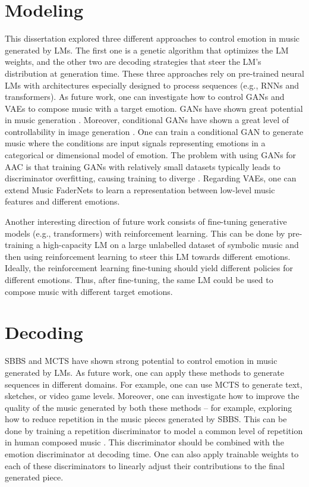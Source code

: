 \section{Modeling}

This dissertation explored three different approaches to control emotion in music generated by LMs. The first one is a genetic algorithm that optimizes the LM weights, and the other two are decoding strategies that steer the LM's distribution at generation time. These three approaches rely on pre-trained neural LMs with architectures especially designed to process sequences (e.g., RNNs and transformers). As future work, one can investigate how to control GANs and VAEs to compose music with a target emotion. GANs have shown great potential in music generation \cite{muhamed2021symbolic}. Moreover, conditional GANs have shown a great level of controllability in image generation \cite{mirza2014conditional}. One can train a conditional GAN to generate music where the conditions are input signals representing emotions in a categorical or dimensional model of emotion. The problem with using GANs for AAC is that training GANs with relatively small datasets typically leads to discriminator overfitting, causing training to diverge \cite{karras2020training}. Regarding VAEs, one can extend Music FaderNets \cite{tan2020music} to learn a representation between low-level music features and different emotions.

Another interesting direction of future work consists of fine-tuning generative models (e.g., transformers) with reinforcement learning. This can be done by pre-training a high-capacity LM on a large unlabelled dataset of symbolic music and then using reinforcement learning to steer this LM towards different emotions. Ideally, the reinforcement learning fine-tuning should yield different policies for different emotions. Thus, after fine-tuning, the same LM could be used to compose music with different target emotions.

\section{Decoding}

SBBS and MCTS have shown strong potential to control emotion in music generated by LMs. As future work, one can apply these methods to generate sequences in different domains. For example, one can use MCTS to generate text, sketches, or video game levels. Moreover, one can investigate how to improve the quality of the music generated by both these methods -- for example, exploring how to reduce repetition in the music pieces generated by SBBS. This can be done by training a repetition discriminator to model a common level of repetition in human composed music \cite{holtzman2018learning}. This discriminator should be combined with the emotion discriminator at decoding time. One can also apply trainable weights to each of these discriminators to linearly adjust their contributions to the final generated piece.


